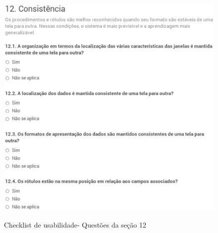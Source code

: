 	\begin{figure}[!h]
    	\centering
    	\includegraphics[keepaspectratio=true,scale=0.55]
      		{figuras/check12.eps}
    	\label{check04}
		\caption{Checklist de usabilidade- Questões da seção 12}
	\end{figure}